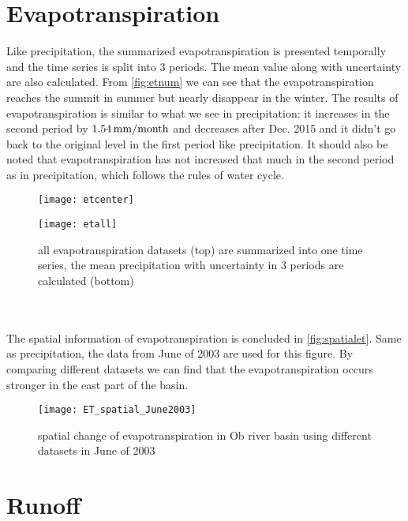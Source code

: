 \section{Evapotranspiration}
Like precipitation, the summarized evapotranspiration is presented temporally and the time series is split into 3 periods. The mean value along with uncertainty are also calculated. From \autoref{fig:etnum} we can see that the evapotranspiration reaches the summit in summer but nearly disappear in the winter. The results of evapotranspiration is similar to what we see in precipitation: it increases in the second period by $1.54 \,\mathrm{mm/month}$ and decreases after Dec. 2015 and it didn't go back to the original level in the first period like precipitation. It should also be noted that evapotranspiration has not increased that much in the second period as in precipitation, which follows the rules of water cycle.
\begin{figure}[htbp]\centering
	\begin{minipage}[t]{0.9\textwidth}
		\centering
		\texttt{[image: etcenter]} %
	\end{minipage}
	\begin{minipage}[t]{0.9\textwidth}
		\centering
		\texttt{[image: etall]} %
	\end{minipage}
	\caption{all evapotranspiration datasets (top) are summarized into one time series, the mean precipitation with uncertainty in 3 periods are calculated (bottom)}
	\label{fig:etnum}
\end{figure}\\\\
The spatial information of evapotranspiration is concluded in \autoref{fig:spatialet}. Same as precipitation, the data from June of 2003 are used for this figure. By comparing different datasets we can find that the evapotranspiration occurs stronger in the east part of the basin.
\begin{figure}[htbp]\centering
	\centering
	\texttt{[image: ET\_spatial\_June2003]} %
	\caption{spatial change of evapotranspiration in Ob river basin using different datasets in June of 2003} 
	\label{fig:spatialet}
\end{figure}
\clearpage
\section{Runoff}
